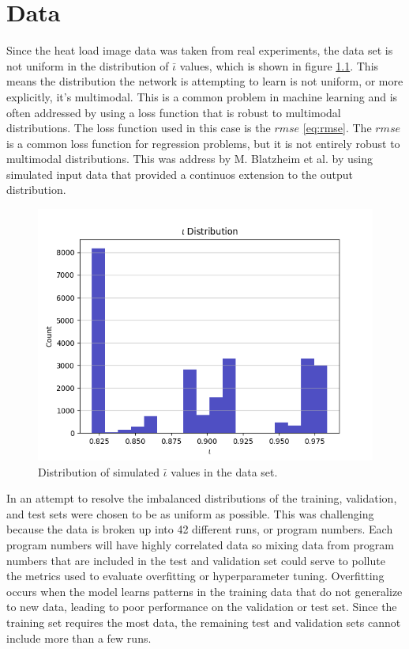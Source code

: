 
\chapter{Data}
\label{sec:Data Distribution}


Since the heat load image data was taken from real experiments, the data set is not uniform in the distribution of $\bar{\iota}$ values, which is shown in figure \ref{fig:data:iota_dist}. This means the distribution the network is attempting to learn is not uniform, or more explicitly, it's multimodal. This is a common problem in machine learning and is often addressed by using a loss function that is robust to multimodal distributions. The loss function used in this case is the $rmse$ \ref{eq:rmse}. The $rmse$ is a common loss function for regression problems, but it is not entirely robust to multimodal distributions. This was address by M. Blatzheim et al. \cite{Blatzheim_2018} by using simulated input data that provided a continuos extension to the output distribution.

\begin{figure}[htb]
	\includegraphics[width=\textwidth]{images/iota-dist.png}
	\caption{Distribution of simulated $\bar{\iota}$ values in the data set.}
	\label{fig:data:iota_dist}
\end{figure}

In an attempt to resolve the imbalanced distributions of the training, validation, and test sets were chosen to be as uniform as possible. This was challenging because the data is broken up into 42 different runs, or program numbers. Each program numbers will have highly correlated data so mixing data from program numbers that are included in the test and validation set could serve to pollute the metrics used to evaluate overfitting or hyperparameter tuning. Overfitting occurs when the model learns patterns in the training data that do not generalize to new data, leading to poor performance on the validation or test set. Since the training set requires the most data, the remaining test and validation sets cannot include more than a few runs.


